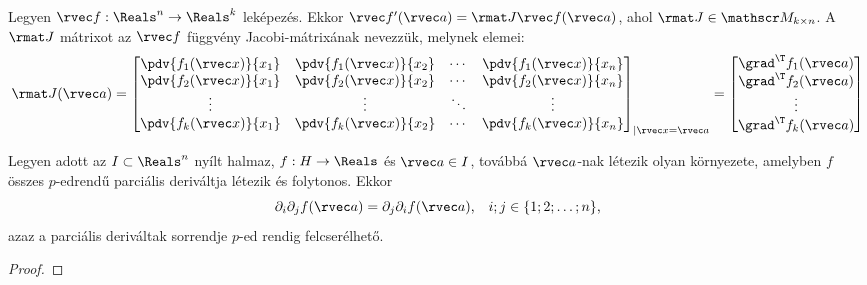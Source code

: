 \begin{definition}
  Legyen $\rvec f: \Reals^n \to \Reals^k$ leképezés.
  Ekkor $\rvec f'(\rvec a) = \rmat J \rvec f(\rvec a)$,
  ahol $\rmat J \in \mathscr M_{k \times n}$. A $\rmat J$ mátrixot az
  $\rvec f$ függvény Jacobi-mátrixának nevezzük, melynek elemei:
  \def\arraystretch{1.5}
  $$
    \rmat J(\rvec a) = \begin{bmatrix}
      \displaystyle\pdv{f_1(\rvec x)}{x_1} & \displaystyle\pdv{f_1(\rvec x)}{x_2} & \cdots & \displaystyle\pdv{f_1(\rvec x)}{x_n} \\
      \displaystyle\pdv{f_2(\rvec x)}{x_1} & \displaystyle\pdv{f_2(\rvec x)}{x_2} & \cdots & \displaystyle\pdv{f_2(\rvec x)}{x_n} \\
      \vdots                               & \vdots                               & \ddots & \vdots                               \\
      \displaystyle\pdv{f_k(\rvec x)}{x_1} & \displaystyle\pdv{f_k(\rvec x)}{x_2} & \cdots & \displaystyle\pdv{f_k(\rvec x)}{x_n}
    \end{bmatrix}_{|\rvec x = \rvec a} = \begin{bmatrix}
      \grad^\T f_1(\rvec a) \vphantom{\displaystyle\pdv{f_1}{x_1}} \\
      \grad^\T f_2(\rvec a) \vphantom{\displaystyle\pdv{f_1}{x_1}} \\
      \vdots                                                       \\
      \grad^\T f_k(\rvec a) \vphantom{\displaystyle\pdv{f_1}{x_1}}
    \end{bmatrix}
  $$
\end{definition}

\begin{theorem}
  Legyen adott az $I \subset \Reals^n$ nyílt halmaz, $f: H \to \Reals$ és
  $\rvec a \in I$, továbbá $\rvec a$-nak létezik olyan környezete, amelyben
  $f$ összes $p$-edrendű parciális deriváltja létezik és folytonos. Ekkor
  $$
    \partial_i \partial_j f(\rvec a) = \partial_j \partial_i f(\rvec a)
    \text,\quad
    i;j \in \{1;2;\ldots;n\}
    \text,
  $$
  azaz a parciális deriváltak sorrendje $p$-ed rendig felcserélhető.

  \begin{proof}
    \vspace{7em}
  \end{proof}
\end{theorem}